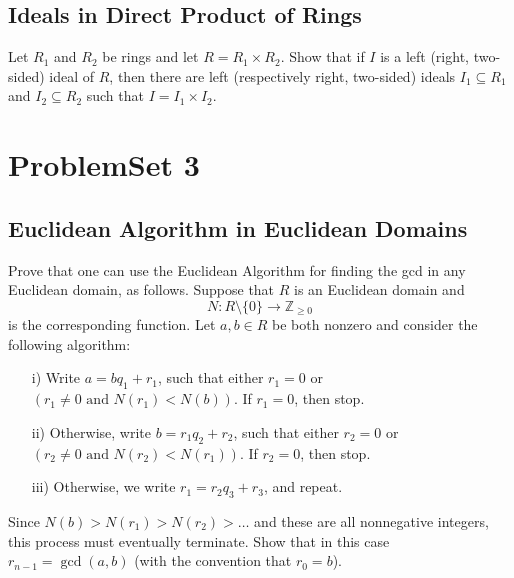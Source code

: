 \documentclass[lang=cn,11pt]{template}
\begin{document}
\section{Ideals in Direct Product of Rings}
Let \( R_1 \) and \( R_2 \) be rings and let \( R = R_1 \times R_2 \). Show that if \( I \) is a left (right, two-sided) ideal of \( R \), then there are left (respectively right, two-sided) ideals \( I_1 \subseteq R_1 \) and \( I_2 \subseteq R_2 \) such that \( I = I_1 \times I_2 \).













\chapter{ProblemSet 3}

\section{Euclidean Algorithm in Euclidean Domains}
Prove that one can use the Euclidean Algorithm for finding the gcd in any Euclidean domain, as follows. Suppose that \( R \) is an Euclidean domain and 
\[
N : R \setminus \{0\} \rightarrow \mathbb{Z}_{\geq 0}
\]
is the corresponding function. Let \( a, b \in R \) be both nonzero and consider the following algorithm:
\begin{itemize}
    \item[i)] Write \( a = bq_1 + r_1 \), such that either \( r_1 = 0 \) or \( (r_1 \neq 0 \text{ and } N(r_1) < N(b)) \). If \( r_1 = 0 \), then stop.
    \item[ii)] Otherwise, write \( b = r_1q_2 + r_2 \), such that either \( r_2 = 0 \) or \( (r_2 \neq 0 \text{ and } N(r_2) < N(r_1)) \). If \( r_2 = 0 \), then stop.
    \item[iii)] Otherwise, we write \( r_1 = r_2q_3 + r_3 \), and repeat.
\end{itemize}
Since \( N(b) > N(r_1) > N(r_2) > \dots \) and these are all nonnegative integers, this process must eventually terminate. Show that in this case \( r_{n-1} = \gcd(a, b) \) (with the convention that \( r_0 = b \)).
\end{document}
